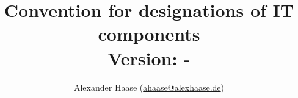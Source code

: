 \documentclass[a4paper,11pt]{article}
\title{
	Convention for designations of IT components \\
	\small Version: \gitVtag-\gitAbbrevHash
}
\author{Alexander Haase (\href{mailto:ahaase@alexhaase.de}{ahaase@alexhaase.de})}
\date{\gitAuthorDate}
\begin{document}
	\maketitle


	

	
	
	
	
	
	


	\nocite{*}
	{}
	
\end{document}
